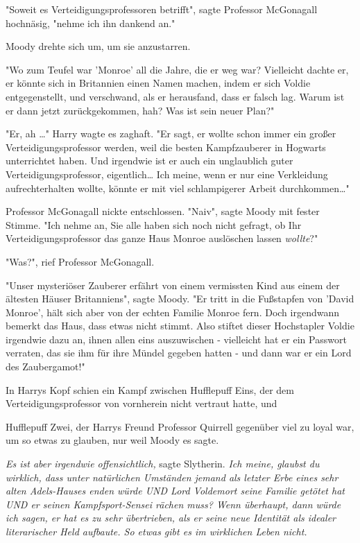 {"Soweit es Verteidigungsprofessoren betrifft", sagte Professor McGonagall hochnäsig, "nehme ich ihn dankend an."

Moody drehte sich um, um sie anzustarren.

"Wo zum Teufel war 'Monroe' all die Jahre, die er weg war? Vielleicht dachte er, er könnte sich in Britannien einen Namen machen, indem er sich Voldie entgegenstellt, und verschwand, als er herausfand, dass er falsch lag. Warum ist er dann jetzt zurückgekommen, hah? Was ist sein neuer Plan?"

"Er, ah …" Harry wagte es zaghaft. "Er sagt, er wollte schon immer ein großer Verteidigungsprofessor werden, weil die besten Kampfzauberer in Hogwarts unterrichtet haben. Und irgendwie ist er auch ein unglaublich guter Verteidigungsprofessor, eigentlich… Ich meine, wenn er nur eine Verkleidung aufrechterhalten wollte, könnte er mit viel schlampigerer Arbeit durchkommen…"

Professor McGonagall nickte entschlossen. "Naiv", sagte Moody mit fester Stimme. "Ich nehme an, Sie alle haben sich noch nicht gefragt, ob Ihr Verteidigungsprofessor das ganze Haus Monroe auslöschen lassen \emph{wollte}?"

"Was?", rief Professor McGonagall.

"Unser mysteriöser Zauberer erfährt von einem vermissten Kind aus einem der ältesten Häuser Britanniens", sagte Moody. "Er tritt in die Fußstapfen von 'David Monroe', hält sich aber von der echten Familie Monroe fern. Doch irgendwann bemerkt das Haus, dass etwas nicht stimmt. Also stiftet dieser Hochstapler Voldie irgendwie dazu an, ihnen allen eins auszuwischen - vielleicht hat er ein Passwort verraten, das sie ihm für ihre Mündel gegeben hatten - und dann war er ein Lord des Zaubergamot!"

In Harrys Kopf schien ein Kampf zwischen Hufflepuff Eins, der dem Verteidigungsprofessor von vornherein nicht vertraut hatte, und

Hufflepuff Zwei, der Harrys Freund Professor Quirrell gegenüber viel zu loyal war, um so etwas zu glauben, nur weil Moody es sagte.

\emph{Es ist aber irgendwie offensichtlich,} sagte Slytherin. \emph{Ich meine, glaubst du wirklich, dass unter natürlichen Umständen jemand als letzter Erbe eines sehr alten Adels-Hauses enden würde UND Lord Voldemort seine Familie getötet hat UND er seinen Kampfsport-Sensei rächen muss? Wenn überhaupt, dann würde ich sagen, er hat es zu sehr übertrieben, als er seine neue Identität als idealer literarischer Held aufbaute. So etwas gibt es im wirklichen Leben nicht.}

}
